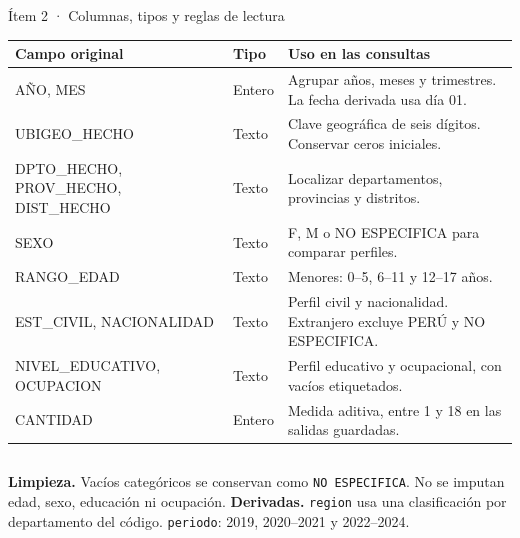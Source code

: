 \begin{frame}[label=campos]{Ítem 2 · Columnas, tipos y reglas de lectura}
  \footnotesize
  \begin{tabularx}{\linewidth}{@{}p{3.8cm}p{1.3cm}X@{}}
    \toprule
    \textbf{Campo original} & \textbf{Tipo} & \textbf{Uso en las consultas}\\
    \midrule
    AÑO, MES & Entero & Agrupar años, meses y trimestres. La fecha derivada usa día 01.\\
    UBIGEO\_HECHO & Texto & Clave geográfica de seis dígitos. Conservar ceros iniciales.\\
    DPTO\_HECHO, PROV\_HECHO, DIST\_HECHO & Texto & Localizar departamentos, provincias y distritos.\\
    SEXO & Texto & F, M o NO ESPECIFICA para comparar perfiles.\\
    RANGO\_EDAD & Texto & Menores: 0--5, 6--11 y 12--17 años.\\
    EST\_CIVIL, NACIONALIDAD & Texto & Perfil civil y nacionalidad. Extranjero excluye PERÚ y NO ESPECIFICA.\\
    NIVEL\_EDUCATIVO, OCUPACION & Texto & Perfil educativo y ocupacional, con vacíos etiquetados.\\
    CANTIDAD & Entero & Medida aditiva, entre 1 y 18 en las salidas guardadas.\\
    \bottomrule
  \end{tabularx}
  \vspace{6pt}
  \begin{columns}[T,onlytextwidth]
    \textbf{Limpieza.} Vacíos categóricos se conservan como \texttt{NO ESPECIFICA}.
    No se imputan edad, sexo, educación ni ocupación.
    \textbf{Derivadas.} \texttt{region} usa una clasificación por departamento del código.
    \texttt{periodo}: 2019, 2020--2021 y 2022--2024.
  \end{columns}
\end{frame}

